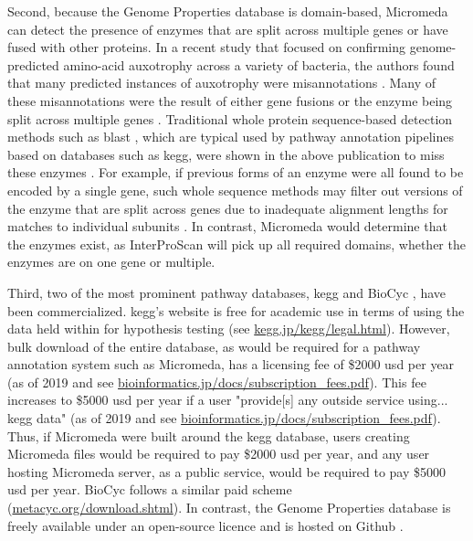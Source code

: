 Second, because the Genome Properties database is domain-based, Micromeda can detect the presence of enzymes that are split across multiple genes or have fused with other proteins. In a recent study that focused on confirming genome-predicted amino-acid auxotrophy across a variety of bacteria, the authors found that many predicted instances of auxotrophy were misannotations \cite{price2018filling}. Many of these misannotations were the result of either gene fusions or the enzyme being split across multiple genes \cite{price2018filling}. Traditional whole protein sequence-based detection methods such as \gls{blast} \cite{altschul1990basic}, which are typical used by pathway annotation pipelines based on databases such as \gls{kegg}, were shown in the above publication to miss these enzymes \cite{price2018filling}. For example, if previous forms of an enzyme were all found to be encoded by a single gene, such whole sequence methods may filter out versions of the enzyme that are split across genes due to inadequate alignment lengths for matches to individual subunits \cite{price2018filling}. In contrast, Micromeda would determine that the enzymes exist, as InterProScan will pick up all required domains, whether the enzymes are on one gene or multiple.

Third, two of the most prominent pathway databases, \gls{kegg} and BioCyc \cite{karp2005expansion}, have been commercialized. \gls{kegg}'s website is free for academic use in terms of using the data held within for hypothesis testing (see \href{www.kegg.jp/kegg/legal.html}{kegg.jp/kegg/legal.html}). However, bulk download of the entire database, as would be required for a pathway annotation system such as Micromeda, has a licensing fee of \$2000 \gls{usd} per year (as of 2019 and see \href{bioinformatics.jp/docs/subscription\_fees.pdf}{bioinformatics.jp/docs/subscription\_fees.pdf}). This fee increases to \$5000 \gls{usd} per year if a user "provide[s] any outside service using... \gls{kegg} data" (as of 2019 and see \href{bioinformatics.jp/docs/subscription\_fees.pdf}{bioinformatics.jp/docs/subscription\_fees.pdf}). Thus, if Micromeda were built around the \gls{kegg} database, users creating Micromeda files would be required to pay \$2000 \gls{usd} per year, and any user hosting Micromeda server, as a public service, would be required to pay \$5000 \gls{usd} per year. BioCyc follows a similar paid scheme (\href{metacyc.org/download.shtml}{metacyc.org/download.shtml}). In contrast, the Genome Properties database is freely available under an open-source licence and is hosted on Github \cite{richardson2018genome}.


